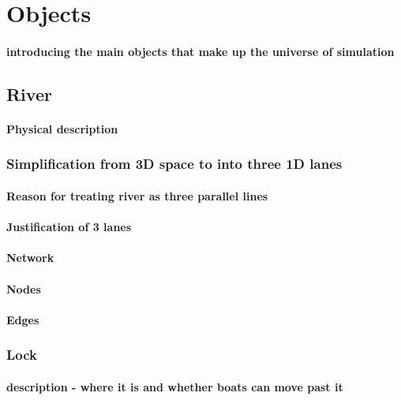   \section{Objects}
    \paragraph{introducing the main objects that make up the universe of simulation}

    \subsection{River}
      \paragraph{Physical description}
      \subsubsection{Simplification from 3D space to into three 1D lanes}
        \paragraph{Reason for treating river as three parallel lines}
        \paragraph{Justification of 3 lanes}
        \paragraph{Network}
        \paragraph{Nodes}
        \paragraph{Edges}
        
      \subsubsection{Lock}
        \paragraph{description - where it is and whether boats can move past it}
        
